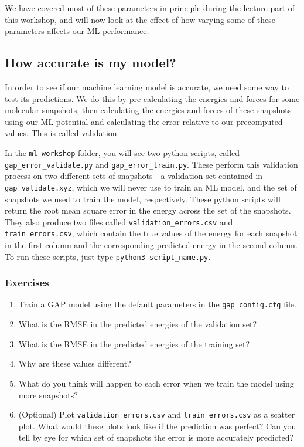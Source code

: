 \documentclass{article}
\begin{document}
We have covered most of these parameters in principle during the lecture part of this workshop, and will now look at the effect of how varying some of these parameters affects our ML performance.

\subsection{How accurate is my model?}

In order to see if our machine learning model is accurate, we need some way to test its predictions. We do this by pre-calculating the energies and forces for some molecular snapshots, then calculating the energies and forces of these snapshots using our ML potential and calculating the error relative to our precomputed values. This is called validation.

In the \verb|ml-workshop| folder, you will see two python scripts, called \verb|gap_error_validate.py| and \verb|gap_error_train.py|. These perform this validation process on two different sets of snapshots - a validation set contained in \verb|gap_validate.xyz|, which we will never use to train an ML model, and the set of snapshots we used to train the model, respectively. These python scripts will return the root mean square error in the energy across the set of the snapshots. They also produce two files called \verb|validation_errors.csv| and \verb|train_errors.csv|, which contain the true values of the energy for each snapshot in the first column and the corresponding predicted energy in the second column. To run these scripts, just type \verb|python3 script_name.py|.

\subsubsection*{Exercises}

\begin{enumerate}
 
\item Train a GAP model using the default parameters in the \verb|gap_config.cfg| file.
\item What is the RMSE in the predicted energies of the validation set?
\item What is the RMSE in the predicted energies of the training set?
\item Why are these values different?
\item What do you think will happen to each error when we train the model using more snapshots?
\item (Optional) Plot \verb|validation_errors.csv| and \verb|train_errors.csv| as a scatter plot. What would these plots look like if the prediction was perfect? Can you tell by eye for which set of snapshots the error is more accurately predicted?

\end{enumerate}
\end{document}
